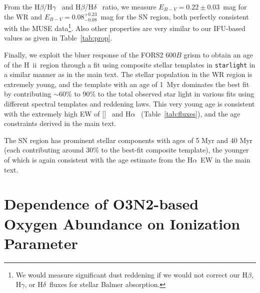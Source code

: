 \documentclass[traditabstract, referee]{aa}
\newcommand{\hb}{H$\beta$}
\newcommand{\ha}{H$\alpha$}
\newcommand{\hg}{H$\gamma$}
\newcommand{\hd}{H$\delta$}
\newcommand{\hii}{\mbox{H~{\sc ii}}}
\newcommand{\oiii}{[\ion{O}{iii}]}
\begin{document}
\begin{appendix}
From the \hb/\hg~ and \hb/\hd~ ratio, we measure $E_{B-V}=0.22\pm0.03$~mag for the WR and $E_{B-V}=0.08_{-0.08}^{+0.23}$~mag for the SN region, both perfectly consistent with the MUSE data\footnote{We would measure significant dust reddening if we would not correct our \hb, \hg, or \hd~fluxes for stellar Balmer absorption.}. Also other properties are very similar to our IFU-based values as given in Table~\ref{tab:prop}.

Finally, we exploit the bluer response of the FORS2 600$B$ grism to obtain an age of the \hii~region through a fit using composite stellar templates in \texttt{starlight} in a similar manner as in the main text. The stellar population in the WR region is extremely young, and the \citet{2003MNRAS.344.1000B} template with an age of 1~Myr dominates the best fit by contributing $\sim$60\% to 90\% to the total observed star light in various fits using different spectral templates and reddening laws. This very young age is consistent with the extremely high EW of \oiii~ and \ha~ (Table~\ref{tab:fluxes}), and the age constraints derived in the main text.

The SN region has prominent stellar components with ages of 5 Myr and 40 Myr (each contributing around 30\% to the best-fit composite template), the younger of which is again consistent with the age estimate from the \ha~EW in the main text.

\section{Dependence of O3N2-based Oxygen Abundance on Ionization Parameter}
\label{sec:abundancevsion}


\end{appendix}
\end{document}
